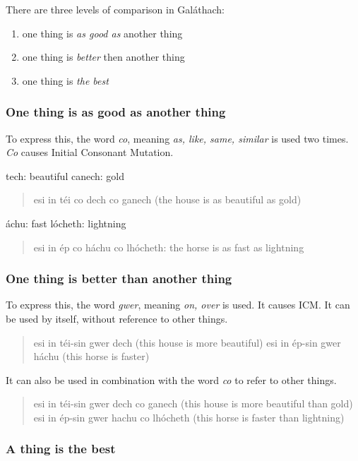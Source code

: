 There are three levels of comparison in Gal\'{a}thach:
\begin{enumerate}
\item one thing is \textit{as good as} another thing
\item one thing is \textit{better} then another thing
\item one thing is \textit{the best}
\end{enumerate}

\subsubsection{One thing is as good as another thing}

To express this, the word \textit{co}, meaning \textit{as, like, same, similar} is used two times. \textit{Co} causes Initial Consonant Mutation.

tech: beautiful
canech: gold
\begin{quote}
esi in t\'{e}i co dech co ganech (the house is as beautiful as gold)
\end{quote}

\'{a}chu: fast
l\'{o}cheth: lightning
\begin{quote}
esi in \'{e}p co h\'{a}chu co lh\'{o}cheth: the horse is as fast as lightning
\end{quote}

\subsubsection{One thing is better than another thing}

To express this, the word \textit{gwer}, meaning \textit{on, over} is used. It causes ICM. It can be used by itself, without reference to other things.

\begin{quote}
esi in t\'{e}i-sin gwer dech (this house is more beautiful)
esi in \'{e}p-sin gwer h\'{a}chu (this horse is faster)
\end{quote}

It can also be used in combination with the word \textit{co} to refer to other things.

\begin{quote}
esi in t\'{e}i-sin gwer dech co ganech (this house is more beautiful than gold)
esi in \'{e}p-sin gwer hachu co lh\'{o}cheth (this horse is faster than lightning)
\end{quote}

\subsubsection{A thing is the best}

